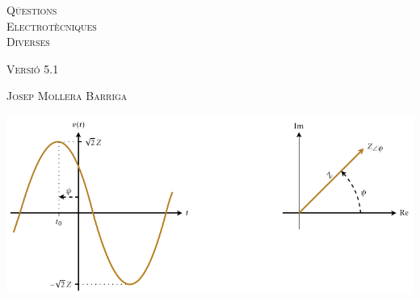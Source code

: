 \begin{titlepage}

   \parbox{18cm}{\fontsize{60pt}{60pt}\selectfont\color{NavyBlue}\scshape%
                 Q\"{u}estions\\[30pt] Electrot\`{e}cniques\\[30pt] Diverses}

   \vspace*{1.8cm}
   {\fontsize{30pt}{30pt}\selectfont\textsc{Versi\'{o} 5.1}}

   \vspace*{2cm}
   {\fontsize{40pt}{40pt}\selectfont\textsc{Josep Mollera Barriga}}

   \vspace*{1.5cm}
   \includegraphics[scale=1.3]{Imatges/Not-Fasor.pdf}

\end{titlepage}
